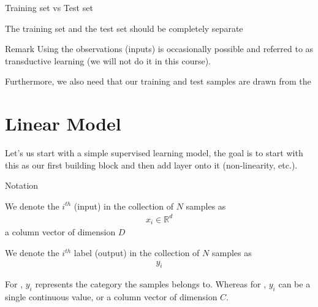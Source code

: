 \begin{parag}{Training set vs Test set}
    \begin{center}
        The training set and the test set should  be completely separate
    \end{center}

	\begin{subparag}{Remark}
	    Using the observations (inputs) is occasionally possible and referred to as transductive learning (we will not do it in this course).
	\end{subparag}
	Furthermore, we also need that our training and test samples are drawn from the 
    
\end{parag}

\section{Linear Model}
Let's us start with a simple supervised learning model, the goal is to start with this as our first building block and then add layer onto it (non-linearity, etc.).



\begin{parag}{Notation}
    \begin{definition}
    We denote the $i^{th}$  (input) in the collection of $N$ samples as 
	\begin{align*} x_i \in \mathbb{R}^{d} \end{align*}
	a column vector of dimension $D$
    \end{definition}
	\begin{definition}
	We denote the $i^{th}$ label (output) in the collection of $N$ samples as 
	\begin{align*} y_i \end{align*}
	\end{definition}
	For , $y_i$ represents the category the samples belongs to. Whereas for , $y_i$ can be a single continuous value, or a column vector of dimension $C$.
\end{parag}


